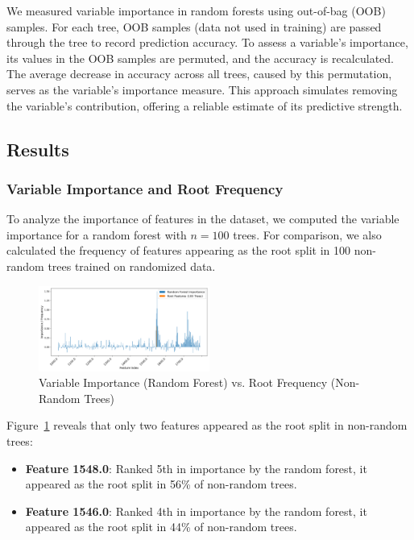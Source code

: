 \documentclass[fleqn,moreauthors,10pt]{ds_report}
\begin{document}
We measured variable importance in random forests using out-of-bag (OOB) samples. For each tree, OOB samples (data not used in training) are passed through the tree to record prediction accuracy. To assess a variable's importance, its values in the OOB samples are permuted, and the accuracy is recalculated. The average decrease in accuracy across all trees, caused by this permutation, serves as the variable's importance measure. This approach simulates removing the variable's contribution, offering a reliable estimate of its predictive strength\cite{ESL}.

\subsection*{Results}


\subsubsection*{Variable Importance and Root Frequency}

To analyze the importance of features in the dataset, we computed the variable importance for a random forest with \( n = 100 \) trees. For comparison, we also calculated the frequency of features appearing as the root split in 100 non-random trees trained on randomized data.

\begin{figure}[h!]
    \centering
    \includegraphics[width=0.5\textwidth]{fig/variable_importance}
    \caption{Variable Importance (Random Forest) vs. Root Frequency (Non-Random Trees)}
    \label{fig:variable_importance}
\end{figure}

Figure~\ref{fig:variable_importance} reveals that only two features appeared as the root split in non-random trees:
\begin{itemize}
\item
 \textbf{Feature 1548.0}: Ranked 5th in importance by the random forest, it appeared as the root split in 56\% of non-random trees.
\item
\textbf{Feature 1546.0}: Ranked 4th in importance by the random forest, it appeared as the root split in 44\% of non-random trees.
\end{itemize}
\end{document}
